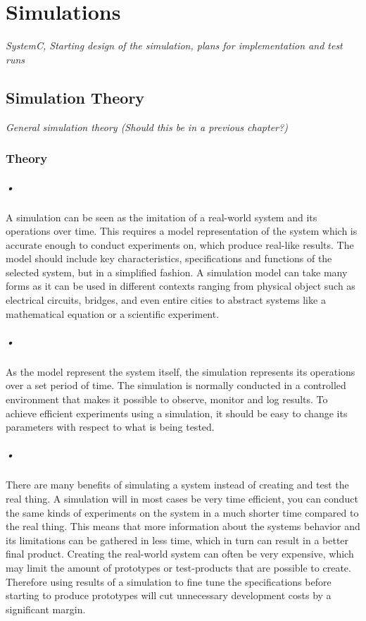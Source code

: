 \documentclass[a4paper, 12pt]{report}
\begin{document}
\chapter{Simulations}

\textit{SystemC, Starting design of the simulation, plans for implementation and test runs}

\section{Simulation Theory}
\textit{General simulation theory (Should this be in a previous chapter?)}

\subsection{Theory}
\paragraph{•}
A simulation can be seen as the imitation of a real-world system and its operations over time.
This requires a model representation of the system which is accurate enough to conduct experiments on, which produce real-like results.
The model should include key characteristics, specifications and functions of the selected system, but in a simplified fashion.
A simulation model can take many forms as it can be used in different contexts ranging from physical object such as electrical circuits, bridges, and even entire cities to abstract systems like a mathematical equation or a scientific experiment\cite{simulations}.

\paragraph{•}
As the model represent the system itself, the simulation represents its operations over a set period of time.
The simulation is normally conducted in a controlled environment that makes it possible to observe, monitor and log results.
To achieve efficient experiments using a simulation, it should be easy to change its parameters with respect to what is being tested.

\paragraph{•}
There are many benefits of simulating a system instead of creating and test the real thing.
A simulation will in most cases be very time efficient, you can conduct the same kinds of experiments on the system in a much shorter time compared to the real thing.
This means that more information about the systems behavior and its limitations can be gathered in less time, which in turn can result in a better final product.
Creating the real-world system can often be very expensive, which may limit the amount of prototypes or test-products that are possible to create.
Therefore using results of a simulation to fine tune the specifications before starting to produce prototypes will cut unnecessary development costs by a significant margin.
\end{document}
